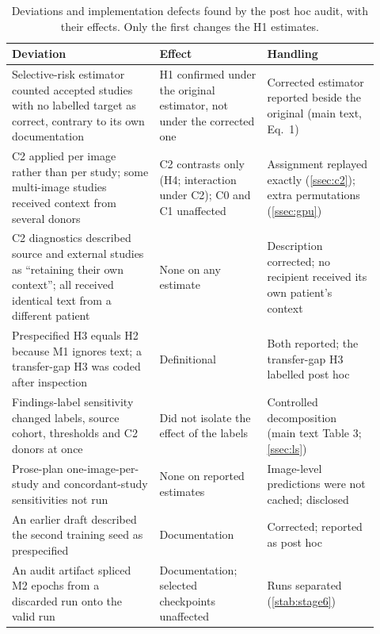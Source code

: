 \documentclass[10pt,a4paper]{article}
\begin{document}
\begin{table}[h]\centering\footnotesize
\caption{Deviations and implementation defects found by the post hoc audit, with
their effects. Only the first changes the H1 estimates.}\label{stab:deviations}
\begin{tabular}{p{0.37\linewidth}p{0.27\linewidth}p{0.28\linewidth}}
\toprule
Deviation & Effect & Handling\\
\midrule
Selective-risk estimator counted accepted studies with no labelled target as
correct, contrary to its own documentation & H1 confirmed under the original
estimator, not under the corrected one & Corrected estimator reported beside the
original (main text, Eq.~1)\\
C2 applied per image rather than per study; some multi-image studies received
context from several donors & C2 contrasts only (H4; interaction under C2); C0
and C1 unaffected & Assignment replayed exactly (\cref{ssec:c2}); extra
permutations (\cref{ssec:gpu})\\
C2 diagnostics described \CTwoIdentSrc{} source and \CTwoIdentExt{} external
studies as ``retaining their own context''; all received identical text from a
different patient & None on any estimate & Description corrected; no recipient
received its own patient's context\\
Prespecified H3 equals H2 because M1 ignores text; a transfer-gap H3 was coded
after inspection & Definitional & Both reported; the transfer-gap H3 labelled
post hoc\\
Findings-label sensitivity changed labels, source cohort, thresholds and C2
donors at once & Did not isolate the effect of the labels & Controlled
decomposition (main text Table 3; \cref{ssec:ls})\\
Prose-plan one-image-per-study and concordant-study sensitivities not run & None
on reported estimates & Image-level predictions were not cached; disclosed\\
An earlier draft described the second training seed as prespecified & Documentation
& Corrected; reported as post hoc\\
An audit artifact spliced M2 epochs from a discarded run onto the valid run &
Documentation; selected checkpoints unaffected & Runs separated
(\cref{stab:stage6})\\
\bottomrule
\end{tabular}
\end{table}

\end{document}

